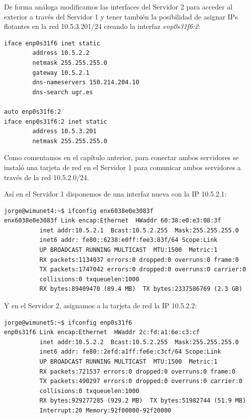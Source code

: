 De forma análoga modificamos las interfaces del Servidor 2 para acceder al exterior a través del Servidor 1 y tener también la posibilidad de asignar IPs flotantes en la red 10.5.3.201/24 creando la interfaz \textit{enp0s31f6:2}:

\begin{lstlisting}[style=Consola]
iface enp0s31f6 inet static
        address 10.5.2.2
        netmask 255.255.255.0
        gateway 10.5.2.1
        dns-nameservers 150.214.204.10
        dns-search ugr.es

auto enp0s31f6:2
iface enp0s31f6:2 inet static
        address 10.5.3.201
        netmask 255.255.255.0
\end{lstlisting}

Como comentamos en el capítulo anterior, para conectar ambos servidores se instaló una tarjeta de red en el Servidor 1 para comunicar ambos servidores a través de la red 10.5.2.0/24. 

Así en el Servidor 1 disponemos de una interfaz nueva con la IP 10.5.2.1:

\begin{lstlisting}[style=Consola]
jorge@wimunet4:~$ ifconfig enx6038e0e3083f
enx6038e0e3083f Link encap:Ethernet  HWaddr 60:38:e0:e3:08:3f
          inet addr:10.5.2.1  Bcast:10.5.2.255  Mask:255.255.255.0
          inet6 addr: fe80::6238:e0ff:fee3:83f/64 Scope:Link
          UP BROADCAST RUNNING MULTICAST  MTU:1500  Metric:1
          RX packets:1134037 errors:0 dropped:0 overruns:0 frame:0
          TX packets:1747042 errors:0 dropped:0 overruns:0 carrier:0
          collisions:0 txqueuelen:1000
          RX bytes:89409470 (89.4 MB)  TX bytes:2337586769 (2.3 GB)
\end{lstlisting}

Y en el Servidor 2, asignamos a la tarjeta de red la IP 10.5.2.2:

\begin{lstlisting}[style=Consola]
jorge@wimunet5:~$ ifconfig enp0s31f6
enp0s31f6 Link encap:Ethernet  HWaddr 2c:fd:a1:6e:c3:cf
          inet addr:10.5.2.2  Bcast:10.5.2.255  Mask:255.255.255.0
          inet6 addr: fe80::2efd:a1ff:fe6e:c3cf/64 Scope:Link
          UP BROADCAST RUNNING MULTICAST  MTU:1500  Metric:1
          RX packets:721537 errors:0 dropped:0 overruns:0 frame:0
          TX packets:490297 errors:0 dropped:0 overruns:0 carrier:0
          collisions:0 txqueuelen:1000
          RX bytes:929277285 (929.2 MB)  TX bytes:51982744 (51.9 MB)
          Interrupt:20 Memory:92f00000-92f20000
\end{lstlisting}

